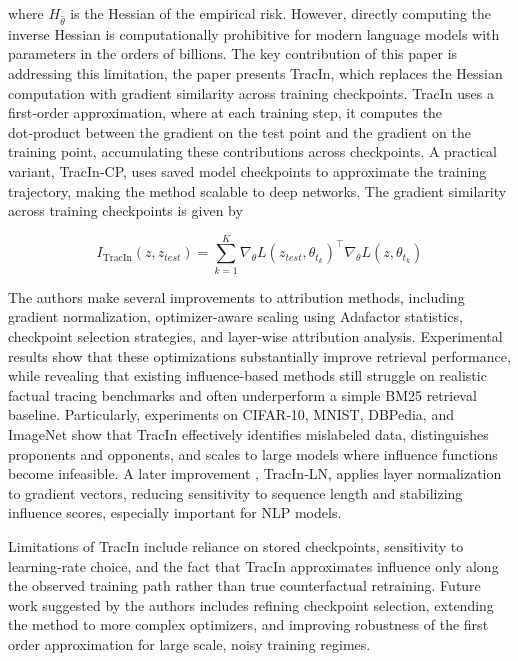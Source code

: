\documentclass{article}
\newcommand{\Hh}{H_{\hat{\theta}}}              %
\begin{document}
where $\Hh$ is the Hessian of the empirical risk. However, directly computing the inverse Hessian is computationally prohibitive for modern language models with parameters in the orders of billions. The key contribution of this paper is addressing this limitation, the paper presents TracIn, which replaces the Hessian computation with gradient similarity across training checkpoints. TracIn uses a first‑order approximation, where at each training step, it computes the dot‑product between the gradient on the test point and the gradient on the training point, accumulating these contributions across checkpoints. A practical variant, TracIn‑CP, uses saved model checkpoints to approximate the training trajectory, making the method scalable to deep networks. The gradient similarity across training checkpoints is given by

\begin{equation}\label{eq:lit-tracin}
    I_{\mathrm{TracIn}}(z,z_{test}) = \sum^K_{k=1} \nabla_\theta L(z_{test}, \theta_{t_k})^\top \nabla_\theta L(z, \theta_{t_k})
\end{equation}

The authors make several improvements to attribution methods, including gradient normalization, optimizer-aware scaling using Adafactor statistics, checkpoint selection strategies, and layer-wise attribution analysis. Experimental results show that these optimizations substantially improve retrieval performance, while revealing that existing influence-based methods still struggle on realistic factual tracing benchmarks and often underperform a simple BM25 retrieval baseline. Particularly, experiments on CIFAR‑10, MNIST, DBPedia, and ImageNet show that TracIn effectively identifies mislabeled data, distinguishes proponents and opponents, and scales to large models where influence functions become infeasible. A later improvement \parencite{rapidin}, TracIn‑LN, applies layer normalization to gradient vectors, reducing sensitivity to sequence length and stabilizing influence scores, especially important for NLP models.

Limitations of TracIn include reliance on stored checkpoints, sensitivity to learning‑rate choice, and the fact that TracIn approximates influence only along the observed training path rather than true counterfactual retraining. Future work suggested by the authors includes refining checkpoint selection, extending the method to more complex optimizers, and improving robustness of the first order approximation for large scale, noisy training regimes.
\end{document}

